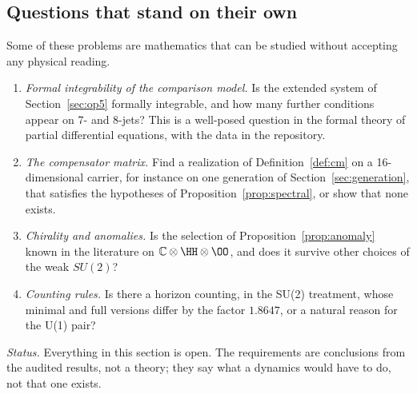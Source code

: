 \subsection{Questions that stand on their own}

Some of these problems are mathematics that can be studied without accepting any physical reading.
\begin{enumerate}
\item \emph{Formal integrability of the comparison model.}  Is the extended system of Section~\ref{sec:op5} formally integrable, and how many
further conditions appear on 7- and 8-jets?  This is a well-posed question in the formal theory of partial differential equations, with
the data in the repository.
\item \emph{The compensator matrix.}  Find a realization of Definition~\ref{def:cm} on a 16-dimensional carrier, for instance on one generation
of Section~\ref{sec:generation}, that satisfies the hypotheses of Proposition~\ref{prop:spectral}, or show that none exists.
\item \emph{Chirality and anomalies.}  Is the selection of Proposition~\ref{prop:anomaly} known in the literature on
\(\mathbb C\otimes\HH\otimes\OO\), and does it survive other choices of the weak \(SU(2)\)?
\item \emph{Counting rules.}  Is there a horizon counting, in the SU(2) treatment, whose minimal and full versions differ by the factor
\(1.8647\), or a natural reason for the U(1) pair?
\end{enumerate}

\medskip\noindent\emph{Status.}  Everything in this section is open.  The requirements are conclusions from the audited results, not a theory;
they say what a dynamics would have to do, not that one exists.
